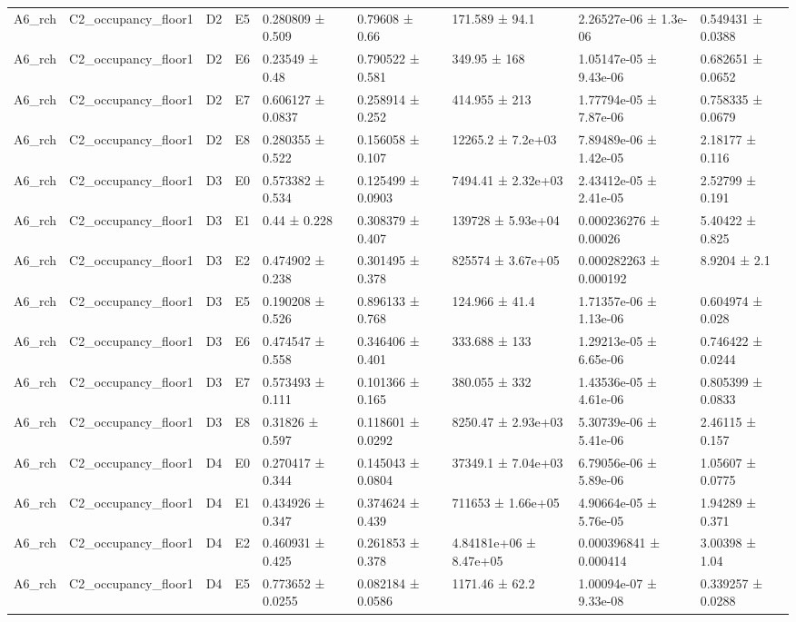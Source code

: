 \begin{table}
\begin{tabular}{lllllllll}
A6\_rch & C2\_occupancy\_floor1 & D2 & E5 & 0.280809 ± 0.509 & 0.79608 ± 0.66 & 171.589 ± 94.1 & 2.26527e-06 ± 1.3e-06 & 0.549431 ± 0.0388 \\
A6\_rch & C2\_occupancy\_floor1 & D2 & E6 & 0.23549 ± 0.48 & 0.790522 ± 0.581 & 349.95 ± 168 & 1.05147e-05 ± 9.43e-06 & 0.682651 ± 0.0652 \\
A6\_rch & C2\_occupancy\_floor1 & D2 & E7 & 0.606127 ± 0.0837 & 0.258914 ± 0.252 & 414.955 ± 213 & 1.77794e-05 ± 7.87e-06 & 0.758335 ± 0.0679 \\
A6\_rch & C2\_occupancy\_floor1 & D2 & E8 & 0.280355 ± 0.522 & 0.156058 ± 0.107 & 12265.2 ± 7.2e+03 & 7.89489e-06 ± 1.42e-05 & 2.18177 ± 0.116 \\
A6\_rch & C2\_occupancy\_floor1 & D3 & E0 & 0.573382 ± 0.534 & 0.125499 ± 0.0903 & 7494.41 ± 2.32e+03 & 2.43412e-05 ± 2.41e-05 & 2.52799 ± 0.191 \\
A6\_rch & C2\_occupancy\_floor1 & D3 & E1 & 0.44 ± 0.228 & 0.308379 ± 0.407 & 139728 ± 5.93e+04 & 0.000236276 ± 0.00026 & 5.40422 ± 0.825 \\
A6\_rch & C2\_occupancy\_floor1 & D3 & E2 & 0.474902 ± 0.238 & 0.301495 ± 0.378 & 825574 ± 3.67e+05 & 0.000282263 ± 0.000192 & 8.9204 ± 2.1 \\
A6\_rch & C2\_occupancy\_floor1 & D3 & E5 & 0.190208 ± 0.526 & 0.896133 ± 0.768 & 124.966 ± 41.4 & 1.71357e-06 ± 1.13e-06 & 0.604974 ± 0.028 \\
A6\_rch & C2\_occupancy\_floor1 & D3 & E6 & 0.474547 ± 0.558 & 0.346406 ± 0.401 & 333.688 ± 133 & 1.29213e-05 ± 6.65e-06 & 0.746422 ± 0.0244 \\
A6\_rch & C2\_occupancy\_floor1 & D3 & E7 & 0.573493 ± 0.111 & 0.101366 ± 0.165 & 380.055 ± 332 & 1.43536e-05 ± 4.61e-06 & 0.805399 ± 0.0833 \\
A6\_rch & C2\_occupancy\_floor1 & D3 & E8 & 0.31826 ± 0.597 & 0.118601 ± 0.0292 & 8250.47 ± 2.93e+03 & 5.30739e-06 ± 5.41e-06 & 2.46115 ± 0.157 \\
A6\_rch & C2\_occupancy\_floor1 & D4 & E0 & 0.270417 ± 0.344 & 0.145043 ± 0.0804 & 37349.1 ± 7.04e+03 & 6.79056e-06 ± 5.89e-06 & 1.05607 ± 0.0775 \\
A6\_rch & C2\_occupancy\_floor1 & D4 & E1 & 0.434926 ± 0.347 & 0.374624 ± 0.439 & 711653 ± 1.66e+05 & 4.90664e-05 ± 5.76e-05 & 1.94289 ± 0.371 \\
A6\_rch & C2\_occupancy\_floor1 & D4 & E2 & 0.460931 ± 0.425 & 0.261853 ± 0.378 & 4.84181e+06 ± 8.47e+05 & 0.000396841 ± 0.000414 & 3.00398 ± 1.04 \\
A6\_rch & C2\_occupancy\_floor1 & D4 & E5 & 0.773652 ± 0.0255 & 0.082184 ± 0.0586 & 1171.46 ± 62.2 & 1.00094e-07 ± 9.33e-08 & 0.339257 ± 0.0288 \\

\end{tabular}
\end{table}
